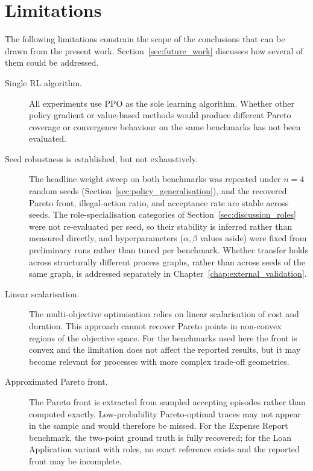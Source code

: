 \section{Limitations}
\label{sec:limitations}

The following limitations constrain the scope of the conclusions that can be drawn from the present work. Section~\ref{sec:future_work} discusses how several of them could be addressed.

\begin{description}

    \item[Single RL algorithm.]
    All experiments use PPO as the sole learning algorithm.
    Whether other policy gradient or value-based methods would
    produce different Pareto coverage or convergence behaviour
    on the same benchmarks has not been evaluated.

    \item[Seed robustness is established, but not exhaustively.]
    The headline weight sweep on both benchmarks was repeated under
    $n=4$ random seeds (Section~\ref{sec:policy_generalisation}), and
    the recovered Pareto front, illegal-action ratio, and acceptance
    rate are stable across seeds. The role-specialisation categories
    of Section~\ref{sec:discussion_roles} were not re-evaluated per
    seed, so their stability is inferred rather than measured
    directly, and hyperparameters ($\alpha,\beta$ values aside) were
    fixed from preliminary runs rather than tuned per benchmark.
    Whether transfer holds across structurally different process
    graphs, rather than across seeds of the same graph, is addressed
    separately in Chapter~\ref{chap:external_validation}.

    \item[Linear scalarisation.]
    The multi-objective optimisation relies on linear
    scalarisation of cost and duration.
    This approach cannot recover Pareto points in non-convex
    regions of the objective space.
    For the benchmarks used here the front is convex and
    the limitation does not affect the reported results,
    but it may become relevant for processes with more
    complex trade-off geometries.

    \item[Approximated Pareto front.]
    The Pareto front is extracted from sampled accepting
    episodes rather than computed exactly.
    Low-probability Pareto-optimal traces may not appear
    in the sample and would therefore be missed.
    For the Expense Report benchmark, the two-point ground
    truth is fully recovered; for the Loan Application
    variant with roles, no exact reference exists and the
    reported front may be incomplete.


\end{description}
